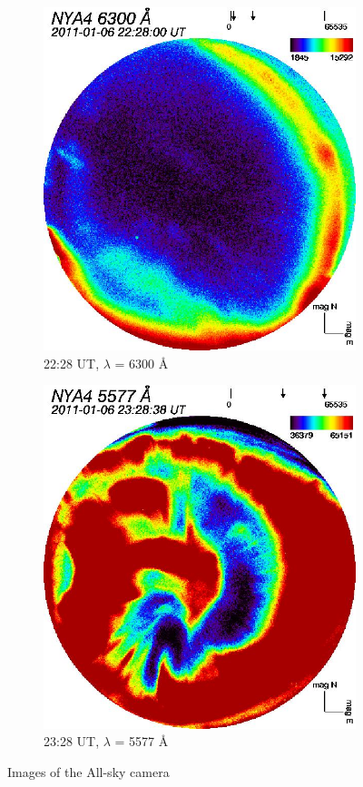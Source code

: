 \documentclass[10pt,a4paper]{article}
\begin{document}
\begin{figure}
\begin{subfigure}{.5\textwidth}
	\includegraphics[width=.8\linewidth]{ame-2228-6300.jpg}
	\centering
	\caption{22:28 UT, $\lambda$ = 6300 Å}
	\label{i1}
\end{subfigure}
\begin{subfigure}{.5\textwidth}
	\includegraphics[width=.8\linewidth]{ame-2328-5577.jpg}
	\centering
	\caption{23:28 UT, $\lambda$ = 5577 Å}
	\label{i2}
\end{subfigure}
\caption{Images of the All-sky camera}
\end{figure}
\end{document}
